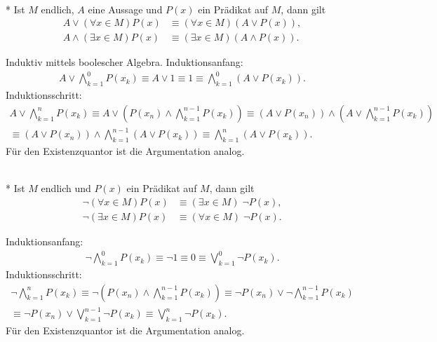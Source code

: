 \begin{Satz}[Distributivgesetze]\mbox{}\\*
Ist $M$ endlich, $A$ eine Aussage und $P(x)$ ein Prädikat auf $M$,
dann gilt
\begin{align*}
A\lor(\forall x\in M)P(x) &\equiv (\forall x\in M)(A\lor P(x)),\\
A\land(\exists x\in M)P(x) &\equiv (\exists x\in M)(A\land P(x)).
\end{align*}
\end{Satz}
 Induktiv mittels boolescher Algebra. Induktionsanfang:
\begin{gather*}
A\lor\bigwedge_{k=1}^0 P(x_k) \equiv A\lor 1 \equiv 1 \equiv \bigwedge_{k=1}^0 (A\lor P(x_k)).
\end{gather*}
Induktionsschritt:
\begin{gather*}
A\lor\bigwedge_{k=1}^n P(x_k) \equiv
A\lor (P(x_n)\land\bigwedge_{k=1}^{n-1} P(x_k))
\equiv (A\lor P(x_n))\land (A\lor\bigwedge_{k=1}^{n-1} P(x_k))\\
\equiv (A\lor P(x_n))\land \bigwedge_{k=1}^{n-1} (A\lor P(x_k))
\equiv \bigwedge_{k=1}^n (A\lor P(x_k)).
\end{gather*}
Für den Existenzquantor ist die Argumentation analog.\;\qedsymbol

\begin{Satz}\mbox{}\\*
Ist $M$ endlich und $P(x)$ ein Prädikat auf $M$, dann gilt
\begin{align*}
\neg(\forall x\in M)P(x) &\equiv (\exists x\in M)\;\neg P(x),\\
\neg(\exists x\in M)P(x) &\equiv (\forall x\in M)\;\neg P(x).
\end{align*}
\end{Satz}
 Induktionsanfang:
\begin{gather*}
\neg\bigwedge_{k=1}^0 P(x_k) \equiv \neg 1 \equiv 0 \equiv\bigvee_{k=1}^0 \neg P(x_k).
\end{gather*}
Induktionsschritt:
\begin{gather*}
\neg\bigwedge_{k=1}^n P(x_k)
\equiv \neg(P(x_n)\land\bigwedge_{k=1}^{n-1} P(x_k))
\equiv \neg P(x_n)\lor\neg\bigwedge_{k=1}^{n-1} P(x_k)\\
\equiv \neg P(x_n)\lor\bigvee_{k=1}^{n-1} \neg P(x_k)
\equiv \bigvee_{k=1}^n \neg P(x_k).
\end{gather*}
Für den Existenzquantor ist die Argumentation analog.\;\qedsymbol

